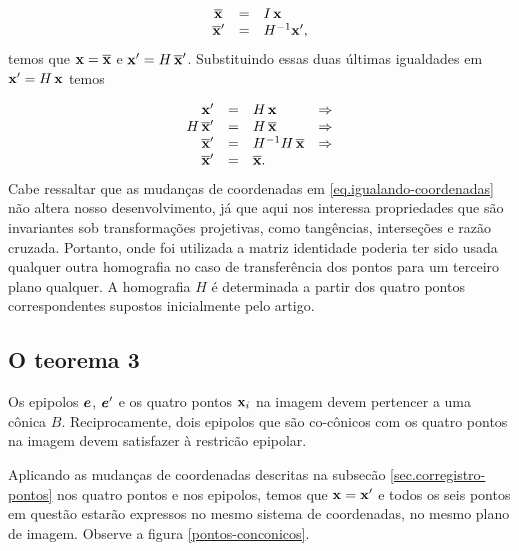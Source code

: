 \begin{equation}\label{eq.igualando-coordenadas}
\begin{array}{rcl}
\overline{\mathbf{x}}\,&=&I\,\mathbf{x}\\
\overline{\mathbf{x}}'&=&H^{-1}\mathbf{x}',
\end{array}
\end{equation}
temos que $\mathbf{x}=\overline{\mathbf{x}}$ e $\mathbf{x}'=H\,\overline{\mathbf{x}}'$. Substituindo essas duas últimas igualdades em $\mathbf{x}'=H\,\mathbf{x}$ temos

\begin{equation*}
\begin{array}{rcll}
\mathbf{x}'&=&H\,\mathbf{x}&\Rightarrow\\
H\,\overline{\mathbf{x}}'&=&H\,\overline{\mathbf{x}}&\Rightarrow\\
\overline{\mathbf{x}}'&=&H^{-1}H\,\overline{\mathbf{x}}&\Rightarrow\\
\overline{\mathbf{x}}'&=&\overline{\mathbf{x}}.&
\end{array}
\end{equation*}
Cabe ressaltar que as mudanças de coordenadas em \ref{eq.igualando-coordenadas} não altera nosso desenvolvimento, já que aqui nos interessa propriedades que são invariantes sob transformações projetivas, como tangências, interseções e raz\~ao cruzada. Portanto, onde foi utilizada a matriz identidade poderia ter sido usada qualquer outra homografia no caso de transferência dos pontos para um terceiro plano qualquer. A homografia $H$ é determinada a partir dos quatro pontos correspondentes supostos inicialmente pelo artigo.

\subsection{O teorema 3}\label{sec.teorema-3}

\begin{teorema}
Os epipolos $\boldsymbol{e}$, $\boldsymbol{e}'$ e os quatro pontos $\mathbf{x}_i$ na imagem devem pertencer a uma cônica $B$. Reciprocamente, dois epipolos que são co-cônicos com os quatro pontos na imagem devem satisfazer à restricão epipolar.
\end{teorema}

Aplicando as mudanças de coordenadas descritas na subsec\~ao \ref{sec.corregistro-pontos} nos quatro pontos e nos epipolos, temos que $\mathbf{x}=\mathbf{x}'$ e todos os seis pontos em questão estarão expressos no mesmo sistema de coordenadas, no mesmo plano de imagem. Observe a figura \ref{pontos-conconicos}.


